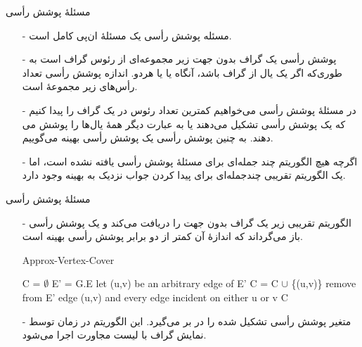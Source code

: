 
\begin{frame}{‌مسئلهٔ پوشش رأسی}
\begin{itemize}\itemr
\item[-]
مسئله پوشش رأسی
یک مسئلهٔ ان‌پی کامل است.
\item[-]
پوشش رأسی یک گراف بدون جهت
زیر مجموعه‌ای از رئوس گراف
است به طوری‌که اگر
یک یال از گراف
باشد، آنگاه
یا
یا هردو. اندازه پوشش رأسی تعداد رأس‌های زیر مجموعهٔ
است.
\item[-]
در مسئلهٔ پوشش رأسی می‌خواهیم کمترین تعداد رئوس در یک گراف را پیدا کنیم که یک پوشش رأسی تشکیل می‌دهند یا به عبارت دیگر همهٔ یال‌ها را پوشش می دهند. به چنین پوشش رأسی یک پوشش رأسی بهینه
می‌گوییم.
\item[-]
اگرچه هیچ الگوریتم چند جمله‌ای برای مسئلهٔ پوشش رأسی یافته نشده است، اما یک الگوریتم تقریبی چندجمله‌ای برای پیدا کردن جواب نزدیک به بهینه وجود دارد.
\end{itemize}
\end{frame}


\begin{frame}{‌مسئلهٔ پوشش رأسی}
\begin{itemize}\itemr
\item[-]
الگوریتم تقریبی زیر یک گراف بدون جهت را دریافت می‌کند و یک پوشش رأسی باز می‌گرداند که اندازهٔ آن کمتر از دو برابر پوشش رأسی بهینه است.
\begin{algorithm}[H]\alglr
  \caption{Approx-Vertex-Cover}
  \begin{algorithmic}[1]
   \State C = $\emptyset$
   \State E' = G.E
   			\State let (u,v) be an arbitrary edge of E'
   			\State C = C $\cup$ \{(u,v)\}
   			\State remove from E' edge (u,v) and every edge incident on either u or v
   	\EndWhile
   	\State \Return C
  \end{algorithmic}
  \label{alg:merge}
\end{algorithm}
\item[-]
متغیر
پوشش رأسی تشکیل شده را در بر می‌گیرد. این الگوریتم در زمان
توسط نمایش گراف با لیست مجاورت اجرا می‌شود.
\end{itemize}
\end{frame}


